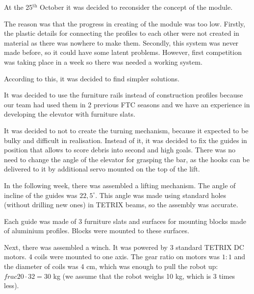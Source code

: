 \begin{enumerate*}
  \item At the 25$^\text{th}$ October it was decided to reconsider the concept of the module.

  The reason was that the progress in creating of the module was too low. Firstly, the plastic details for connecting the profiles to each other were not created in material as there was nowhere to make them. Secondly, this system was never made before, so it could have some latent problems. However, first competition was taking place in a week so there was needed a working system.

  According to this, it was decided to find simpler solutions.
  \begin{enumerate*}
  	
  	\item It was decided to use the furniture rails instead of construction profiles because our team had used them in 2 previous FTC seasons and we have an experience in developing the elevator with furniture slats.
  	
  	\item It was decided to not to create the turning mechanism, because it expected to be bulky and difficult in realisation. Instead of it, it was decided to fix the guides in position that allows to score debris into second and high goals. There was no need to change the angle of the elevator for grasping the bar, as the hooks can be delivered to it by additional servo mounted on the top of the lift.
  	
  \end{enumerate*}

  \item In the following week, there was assembled a lifting mechanism. The angle of incline of the guides was $22,5^\circ$. This angle was made using standard holes (without drilling new ones) in TETRIX beams, so the assembly was accurate.

  Each guide was made of 3 furniture slats and surfaces for mounting blocks made of aluminium profiles. Blocks were mounted to these surfaces. %

  Next, there was assembled a winch. %
  It was powered by 3 standard TETRIX DC motors. 4 coils were mounted to one axis. The gear ratio on motors was $1:1$ and the diameter of coils was 4 cm, which was enough to pull the robot up: $frac{20 \cdot 3}{2} = 30$ kg (we assume that the robot weighs 10 kg, which is 3 times less).
  


\end{enumerate*}
